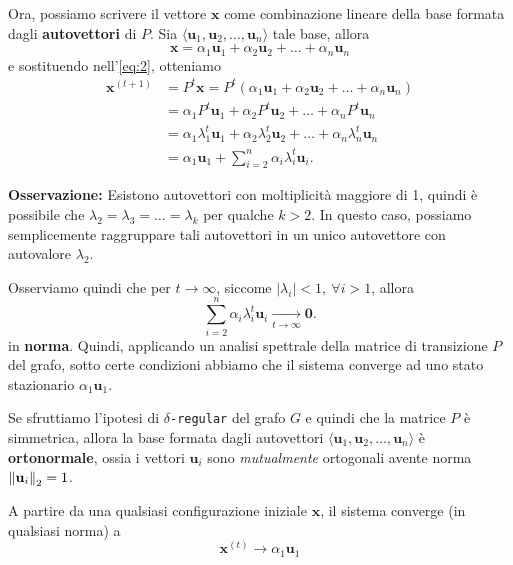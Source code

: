 Ora, possiamo scrivere il vettore $\mathbf{x}$ come combinazione lineare della base formata dagli \textbf{autovettori} di $P$. Sia $\langle \mathbf{u}_1, \mathbf{u}_2, \dots, \mathbf{u}_n \rangle$ tale base, allora 
\[
    \mathbf{x} = \alpha_1\mathbf{u}_1 + \alpha_2\mathbf{u}_2 + \dots + \alpha_n\mathbf{u}_n
\]
e sostituendo nell'\autoref{eq:2}, otteniamo
\begin{equation}\label{eq:decomp-pt}
\begin{aligned}
    \mathbf{x}^{(t+1)}
    &= P^t \mathbf{x}
    = P^t\left(\alpha_1\mathbf{u}_1 + \alpha_2\mathbf{u}_2 + \dots + \alpha_n\mathbf{u}_n\right) \\
    &= \alpha_1 P^t\mathbf{u}_1 + \alpha_2 P^t\mathbf{u}_2 + \dots + \alpha_n P^t\mathbf{u}_n \\
    &= \alpha_1 \lambda_1^t \mathbf{u}_1 + \alpha_2 \lambda_2^t \mathbf{u}_2 + \dots + \alpha_n \lambda_n^t \mathbf{u}_n \\
    &= \alpha_1 \mathbf{u}_1 + \sum_{i=2}^{n} \alpha_i \lambda_i^t \mathbf{u}_i.
\end{aligned}
\end{equation}

\textbf{Osservazione:} Esistono autovettori con moltiplicità maggiore di 1, quindi è possibile che $\lambda_2 = \lambda_3 = \dots = \lambda_k$ per qualche $k > 2$. In questo caso, possiamo semplicemente raggruppare tali autovettori in un unico autovettore con autovalore $\lambda_2$.

Osserviamo quindi che per $t \to \infty$, siccome $|\lambda_i| < 1,\ \forall i > 1$, allora 
\[
    \sum_{i=2}^{n} \alpha_i \lambda_i^t \mathbf{u}_i \xrightarrow[t \to \infty]{} \mathbf{0}.
\]
in \textbf{norma}. 
Quindi, applicando un analisi spettrale della matrice di transizione $P$ del grafo, sotto certe condizioni abbiamo che il sistema converge ad uno stato stazionario $\alpha_1\mathbf{u}_1$.

Se sfruttiamo l'ipotesi di $\delta$\texttt{-regular} del grafo $G$ e quindi che la matrice $P$ è simmetrica, allora la base formata dagli autovettori $\langle \mathbf{u}_1, \mathbf{u}_2, \dots, \mathbf{u}_n \rangle$ è \textbf{ortonormale}, ossia i vettori $\mathbf{u}_i$ sono \textit{mutualmente} ortogonali avente norma $\norm{\mathbf{u}_i}_2 = 1$.

\begin{lemma}
    A partire da una qualsiasi configurazione iniziale $\mathbf{x}$, il sistema converge (in qualsiasi norma) a 
    \begin{equation}\label{eq:convergence}
        \mathbf{x}^{(t)} \to \alpha_1\mathbf{u}_1
    \end{equation}
\end{lemma}

